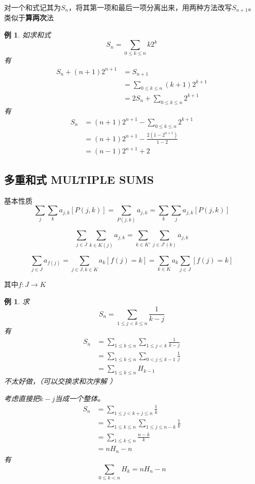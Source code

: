 \documentclass[12pt, a4paper, oneside]{ctexbook}
\newtheorem{example}[theorem]{例}
\begin{document}
对一个和式记其为$S_n$，将其第一项和最后一项分离出来，用两种方法改写$S_{n+1}$。\\

类似于\textbf{算两次}法

\begin{example}
  如求和式
  $$
  S_n=\sum_{0\le k \le n} k2^k
  $$
  有
  $$
  \begin{aligned}
  S_n+(n+1)2^{n+1}&=S_{n+1}\\
  &=\sum_{0 \le k \le n}(k+1)2^{k+1}\\
  &=2S_n+\sum_{0\le k \le n} 2^{k+1}
  \end{aligned}
  $$
  有
  $$
  \begin{aligned}
  S_n&=(n+1)2^{n+1}-\sum_{0 \le k \le n} 2^{k+1}\\
  &=(n+1)2^{n+1}-\frac{2(1-2^{n+1})}{1-2}\\
  &=(n-1)2^{n+1}+2
  \end{aligned}
  $$
\end{example}

\subsection{多重和式 MULTIPLE SUMS }

基本性质
$$
\sum_j\sum_ka_{j,k}[P(j,k)]=\sum_{P(j,k)}a_{j,k}=\sum_{k}\sum_ja_{j,k}[P(j,k)]
$$

$$
\sum_{j\in J}\sum_{k\in K(j)} a_{j,k} =\sum_{k\in K'}\sum_{j\in J'(k)} a_{j,k}
$$

$$
\sum_{j\in J}a_{f(j)}=\sum_{j\in J,k\in K} a_k[f(j)=k]=\sum_{k\in K} a_k \sum_{j\in J} [f(j)=k]
$$

其中$f: J\rightarrow K$

\begin{example}
  求
$$
S_n=\sum_{1\le j <k\le n}\frac{1}{k-j}
$$
有
$$
\begin{aligned}
S_n&=\sum_{1\le k \le n} \sum_{1\le j<k}\frac{1}{k-j}\\
&=\sum_{1\le k \le n} \sum_{0<j\le k-1}\frac{1}{j}\\
&=\sum_{1\le k \le n} H_{k-1}
\end{aligned}
$$
不太好做，（可以交换求和次序解 ）

考虑直接把$k-j$当成一个整体。
$$
\begin{aligned}
S_n&=\sum_{1\le j<k+j\le n}\frac{1}{k}\\
&=\sum_{1\le k \le n}\sum_{1\le j\le n-k} \frac{1}{k}\\
&=\sum_{1\le k \le n} \frac{n-k}{k}\\
&=nH_{n}-n
\end{aligned}
$$
有
$$
\sum_{0\le k <n} H_k=nH_{n}-n
$$
\end{example}
\end{document}
